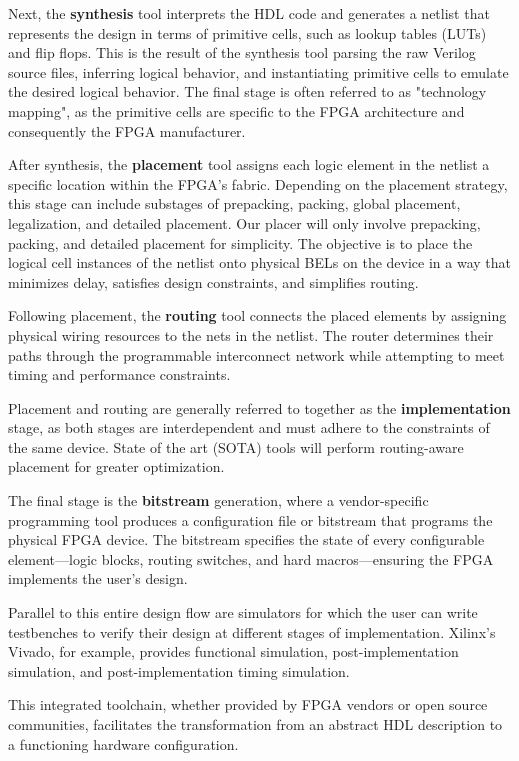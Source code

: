 \documentclass[twocolumn]{article}
\begin{document}
    Next, the \textbf{synthesis} tool interprets the HDL code and generates a netlist that represents the design in terms of primitive cells, such as lookup tables (LUTs) and flip flops. 
    This is the result of the synthesis tool parsing the raw Verilog source files, inferring logical behavior, and instantiating primitive cells to emulate the desired logical behavior. 
    The final stage is often referred to as "technology mapping", as the primitive cells are specific to the FPGA architecture and consequently the FPGA manufacturer. 

    After synthesis, the \textbf{placement} tool assigns each logic element in the netlist a specific location within the FPGA’s fabric. 
    Depending on the placement strategy, this stage can include substages of prepacking, packing, global placement, legalization, and detailed placement. 
    Our placer will only involve prepacking, packing, and detailed placement for simplicity. 
    The objective is to place the logical cell instances of the netlist onto physical BELs on the device in a way that minimizes delay, satisfies design constraints, and simplifies routing. 

    Following placement, the \textbf{routing} tool connects the placed elements by assigning physical wiring resources to the nets in the netlist. 
    The router determines their paths through the programmable interconnect network while attempting to meet timing and performance constraints.

    Placement and routing are generally referred to together as the \textbf{implementation} stage, as both stages are interdependent and must adhere to the constraints of the same device. 
    State of the art (SOTA) tools will perform routing-aware placement for greater optimization. 

    The final stage is the \textbf{bitstream} generation, where a vendor-specific programming tool produces a configuration file or bitstream that programs the physical FPGA device. 
    The bitstream specifies the state of every configurable element—logic blocks, routing switches, and hard macros—ensuring the FPGA implements the user's design. 


    Parallel to this entire design flow are simulators for which the user can write testbenches to verify their design at different stages of implementation.
    Xilinx's Vivado, for example, provides functional simulation, post-implementation simulation, and post-implementation timing simulation.

    This integrated toolchain, whether provided by FPGA vendors or open source communities, facilitates the transformation from an abstract HDL description to a functioning hardware configuration.
\end{document}
